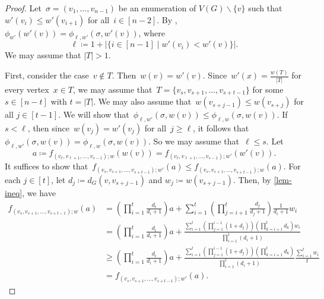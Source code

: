 \documentclass[reqno, 12pt]{amsart}
\numberwithin{equation}{section}
\numberwithin{figure}{section}
\theoremstyle{plain}
\theoremstyle{definition}
\let\setminus=\smallsetminus
\newcommand*{\abs}[1]{\ensuremath{{\left\lvert {#1} \right\rvert}}}
\begin{document}
\begin{proof}
    Let~${\sigma=(v_1, \ldots, v_{n-1})}$ be an enumeration of $V(G)\setminus \{v\}$ such that~${w'(v_i) \leq w'(v_{i+1})}$ for all~${i \in [n-2]}$. 
    By , ${\phi_{w'}(w'(v)) = \phi_{\ell, w'}(\sigma, w'(v))}$, where
    \[ \ell\coloneq 1+\abs{\{ i\in[n-1]\mid w'(v_i)<w'(v)\}}.\]
    We may assume that $\abs{T}>1$.
     

    First, consider the case~${v \notin T}$. 
    Then~${w(v) = w'(v)}$. 
    Since~${w'(x) = \frac{w(T)}{\abs{T}}}$ for every vertex~$x\in T$, we may assume that~${T=\{v_s,v_{s+1},\ldots,v_{s+t-1}\}}$ for some~${s \in [n-t]}$ with $t=\abs{T}$.
    We may also assume that~${w(v_{s+j-1}) \leq w(v_{s+j})}$ for all $j\in [t-1]$.
    We will show that~${\phi_{\ell, w'}(\sigma, w(v)) \leq \phi_{\ell, w}(\sigma, w(v))}$. 
    If~${s < \ell}$, then since~${w(v_j) = w'(v_j)}$ for all~${j \geq \ell}$, it follows that ${\phi_{\ell, w'}(\sigma, w(v)) = \phi_{\ell, w}(\sigma, w(v))}$. 
    So we may assume that~${\ell \leq s}$. 
    Let 
    \[
        a \coloneqq f_{(v_{\ell}, v_{\ell+1}, \ldots, v_{s-1}); w}(w(v)) = f_{(v_{\ell}, v_{\ell+1}, \ldots, v_{s-1}); w'}(w'(v)). 
    \]
    It suffices to show that~${f_{(v_s, v_{s+1},\ldots,v_{s+t-1}); w'}(a) \leq f_{(v_s, v_{s+1},\ldots,v_{s+t-1}); w}(a)}$. 
    For each $j\in [t]$, let $d_j\coloneqq d_G(v,v_{s+j-1})$
    and $w_j\coloneqq w(v_{s+j-1})$.
    Then, by \cref{lem-ineq}, we have 
    \begin{align*}
        f_{(v_s, v_{s+1},\ldots,v_{s+t-1});w}(a) 
        &= \left(\prod\limits_{i=1}^t\frac{d_i}{d_i+1} \right)a 
        + \sum_{i=1}^t \left(\prod\limits_{j=i+1}^t \frac{d_j}{d_j+1} \right)\frac{1}{d_i+1} w_i\\
        &=\left(\prod\limits_{i=1}^t\frac{d_i}{d_i+1} \right)a 
        + \frac{
        \sum\limits_{i=1}^t \left(\prod\limits_{j=1}^{i-1}(1+d_j)\right)\left(\prod\limits_{k=i+1}^t d_k \right) w_i }
        {\prod\limits_{i=1}^t (d_i+1)}\\
        &\ge \left(\prod\limits_{i=1}^t\frac{d_i}{d_i+1} \right)a 
        +  \frac{
        \sum\limits_{i=1}^t \left(\prod\limits_{j=1}^{i-1}(1+d_j)\right)\left(\prod\limits_{k=i+1}^t d_k \right) }
        {\prod\limits_{i=1}^t (d_i+1)}\frac{\sum\limits_{i=1}^t w_i}{t} \\
        &= f_{(v_s, v_{s+1},\ldots,v_{s+t-1});w'}(a).
    \end{align*}


\end{proof}
\end{document}
